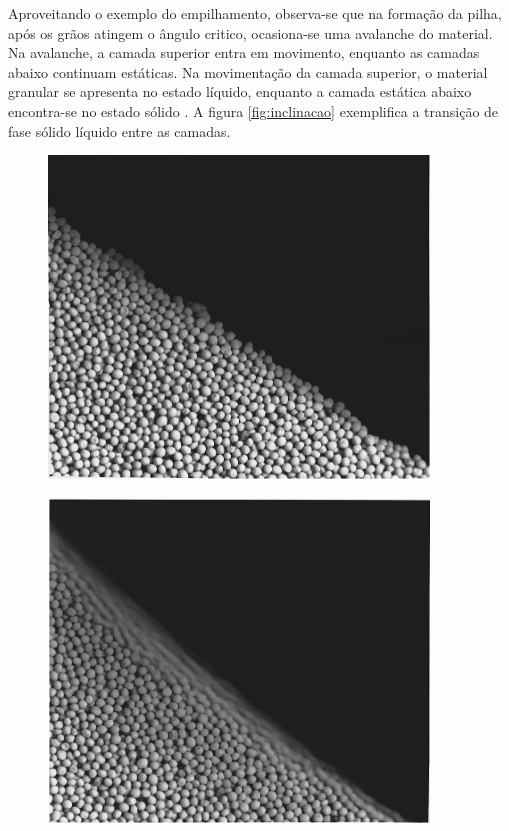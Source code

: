     Aproveitando o exemplo do empilhamento, observa-se que na formação da pilha, após os grãos atingem o ângulo critico, ocasiona-se uma avalanche do material. Na avalanche, a camada superior entra em movimento, enquanto as camadas abaixo continuam estáticas. Na movimentação da camada superior, o material granular se apresenta no estado líquido, enquanto a camada estática abaixo encontra-se no estado sólido \cite{Granular_Solids_Liquids_and_Gases}. A figura \ref{fig:inclinacao} exemplifica a transição de fase sólido líquido entre as camadas.

\begin{figure}
    \centering
    \begin{minipage}{.45\linewidth}
        \centering
        \includegraphics[width=0.9\textwidth]{04-figuras/Pilha1.png}
        \label{fig:inclinacao:solido}
    \end{minipage}
    \begin{minipage}{.45\linewidth}
        \centering
        \includegraphics[width=0.9\textwidth]{04-figuras/Pilha2.png}

\end{minipage}
\end{figure}

